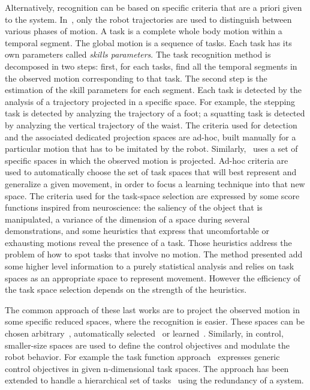 \documentclass[letterpaper, 10pt, conference]{ieeeconf}      %
\begin{document}
Alternatively, recognition can be based on specific criteria that are a priori given 
to the system. In~\cite{nakaoka07}, only the robot trajectories
are used to distinguish between various phases of motion. A task is
a complete whole body motion within a temporal segment. The global motion
is a sequence of tasks. Each task has its own
parameters called \emph{skills parameters}. The task recognition method is decomposed in two steps: 
first, for each tasks, find all the temporal segments in the observed motion
corresponding to that task.
The second step is the estimation of the skill parameters for each segment.
Each task is detected by the analysis of a trajectory projected in a specific space.
For example, the stepping task is detected by analyzing the trajectory 
of a foot; a squatting task is detected by analyzing the vertical trajectory of the waist.
The criteria used for detection and the associated dedicated projection spaces
are ad-hoc, built manually for a particular motion that has to be imitated by the robot.
Similarly,~\cite{muhlig09} uses a set of specific spaces
in which the observed motion is projected. Ad-hoc criteria
are used to automatically choose the set of task spaces that will best 
represent and generalize a given movement, in order to focus
a learning technique into that new space. The criteria used for the task-space selection
are expressed by some score functions inspired from neuroscience:
the saliency of the object that is manipulated, a variance of the dimension
of a space during several demonstrations, and some heuristics that express that
uncomfortable or exhausting motions reveal the presence of a task. Those heuristics
address the problem of how to spot tasks that involve no motion. The method
presented add some higher level information to a purely statistical analysis and relies
on task spaces as an appropriate space to represent movement. However
the efficiency of the task space selection depends on the strength
of the heuristics.

The common approach of these last works are to project the observed motion in some specific reduced spaces,
where the recognition is easier. These spaces can be chosen arbitrary~\cite{nakaoka07}, 
automatically selected~\cite{muhlig09} or learned~\cite{peters08}. Similarly, in control,
smaller-size spaces are used to define the control objectives and modulate the robot behavior.
For example the task function approach~\cite{samson91} expresses generic control objectives in
given n-dimensional task spaces.
The approach has been extended to handle a hierarchical set of tasks~\cite{siciliano91, nakamura87}
using the redundancy of a system.
\medskip
\end{document}

